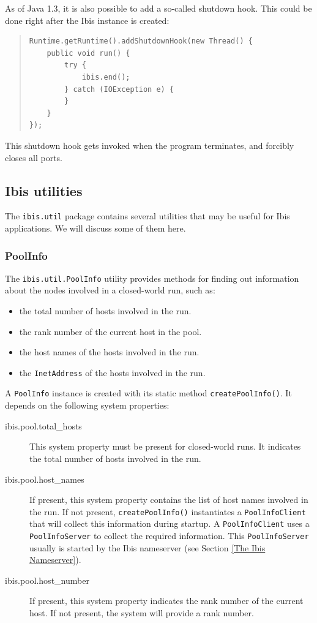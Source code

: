 \documentclass[10pt]{article}
\newcommand{\mysubsection}[1]{\subsection{#1}\label{#1}}
\newcommand{\mysubsubsection}[1]{\subsubsection{#1}\label{#1}}
\begin{document}
As of Java 1.3, it is also possible to add a so-called shutdown hook.
This could be done right after the Ibis instance is created:
\begin{quote}
\begin{verbatim}
Runtime.getRuntime().addShutdownHook(new Thread() {
    public void run() {
        try {
            ibis.end();
        } catch (IOException e) {
        }
    }
});
\end{verbatim}
\end{quote}
\noindent
This shutdown hook gets invoked when the program terminates, and
forcibly closes all ports.

\mysubsection{Ibis utilities}

The \texttt{ibis.util} package contains several utilities that may be
useful for Ibis applications. We will discuss some of them here.

\mysubsubsection{PoolInfo}

The \texttt{ibis.util.PoolInfo} utility
provides methods for finding out information about the nodes
involved in a closed-world run, such as:
\begin{itemize}
\item
the total number of hosts involved in the run.
\item
the rank number of the current host in the pool.
\item
the host names of the hosts involved in the run.
\item
the \texttt{InetAddress} of the hosts involved in the run.
\end{itemize}

\noindent
A \texttt{PoolInfo} instance is created with its 
static method \texttt{createPoolInfo()}.
It depends on the following system properties:
\begin{description}
\item[ibis.pool.total\_hosts]
This system property must be present for closed-world runs.
It indicates the total number of hosts involved in the run.
\item[ibis.pool.host\_names]
If present, this system property contains the list of host names
involved in the run.
If not present, \texttt{createPoolInfo()} instantiates
a \texttt{PoolInfoClient}
that will collect this information during startup.
A \texttt{PoolInfoClient} uses a \texttt{PoolInfoServer} to collect the
required information.
This \texttt{PoolInfoServer} usually is started by the Ibis nameserver
(see Section \ref{The Ibis Nameserver}).

\item[ibis.pool.host\_number]
If present, this system property indicates the rank number of the
current host. If not present, the system will provide a rank number.
\end{description}
\end{document}
